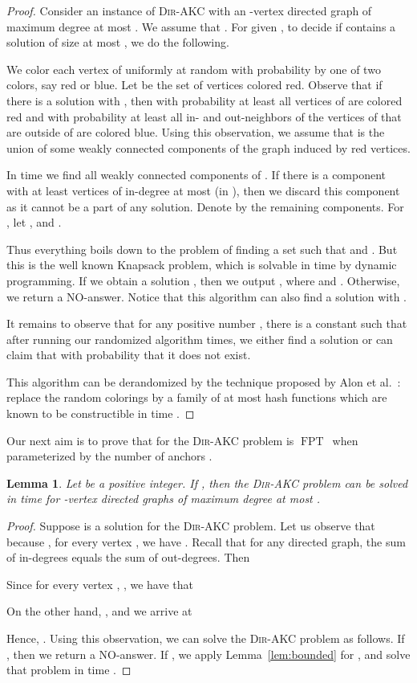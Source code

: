\documentclass[11pt,a4paper]{article}
\newtheorem{lemma}{Lemma}
\DeclareMathOperator{\operatorClassFPT}{FPT}
\newcommand{\classFPT}{\ensuremath{\operatorClassFPT}}
\newcommand{\DAKC}{\textsc{Dir-AKC}\xspace}
\begin{document}
\begin{proof}
Consider an instance of \DAKC with an -vertex directed graph  of maximum degree at most . We assume that . For given , to decide if  contains a solution of size at  most , we do the following.

We color each vertex of  uniformly at random with probability  by one of  two colors, say red or
blue. Let   be the set of vertices  colored red. Observe that if there is a solution  with , then with
probability at least  all vertices of  are colored red and with probability at least 
all 
in- and out-neighbors of the vertices of  that are outside of  are colored blue. Using this observation, we assume that
 is the union of some weakly connected components of  the graph  induced by red vertices.

In time  we find all weakly connected components of . If there is a component  with at least 
vertices of in-degree at most  (in ), then we discard this component as it cannot be a part of any solution. Denote by
 the remaining components. For , let ,  and
.

Thus everything boils down to the problem of finding a set  such that  and
.  But this is  the well known {\sc Knapsack} problem, which  is solvable in time  by dynamic
programming. If we obtain a solution , then we output , where  and .
Otherwise, we return a NO-answer. Notice that this algorithm can also find a solution   with .


It remains to observe that for any positive number , there is a constant  such that after running our
randomized algorithm  times, we either find a solution  or can claim that with
probability  that it does not exist.


This algorithm can be derandomized by the  technique proposed by Alon et al.~\cite{AlonYZ95}: replace the random colorings by
a family of at most  hash functions which are known to be constructible  in time .
\end{proof}


Our next aim is to prove that for  the \DAKC problem is \classFPT\ when parameterized by the number of anchors
.

\begin{lemma}\label{lem:bound-deg-anchors}
Let  be a positive integer. If , then the \DAKC problem can be solved in time  for -vertex directed graphs of maximum degree at most .
\end{lemma}

\begin{proof}
Suppose  is a solution for the \DAKC problem. Let us observe that because , for every vertex ,  we have . Recall that for any directed graph, the sum of in-degrees equals the sum of
out-degrees. Then

Since for every vertex ,  , we have that

On the other hand,  , and we arrive at

Hence, . Using this observation, we can solve the \DAKC problem as follows. If
, then we return a NO-answer. If , we apply Lemma~\ref{lem:bounded} for , and
solve that problem in time  .
\end{proof}
\end{document}
